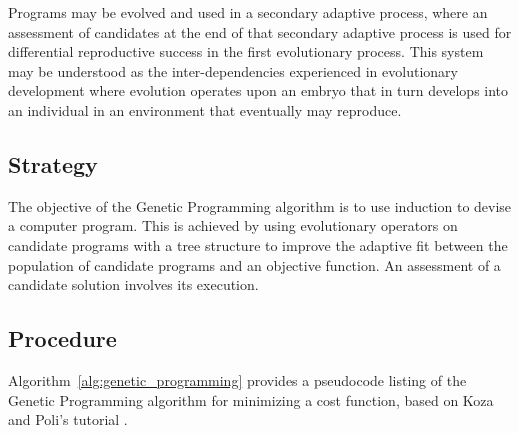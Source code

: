 Programs may be evolved and used in a secondary adaptive process, where an assessment of candidates at the end of that secondary adaptive process is used for differential reproductive success in the first evolutionary process. This system may be understood as the inter-dependencies experienced in evolutionary development where evolution operates upon an embryo that in turn develops into an individual in an environment that eventually may reproduce.

\subsection{Strategy}
The objective of the Genetic Programming algorithm is to use induction to devise a computer program. 
This is achieved by using evolutionary operators on candidate programs with a tree structure to improve the adaptive fit between the population of candidate programs and an objective function. An assessment of a candidate solution involves its execution.

\subsection{Procedure}
Algorithm~\ref{alg:genetic_programming} provides a pseudocode listing of the Genetic Programming algorithm for minimizing a cost function, based on Koza and Poli's tutorial \cite{Koza2005}. 

